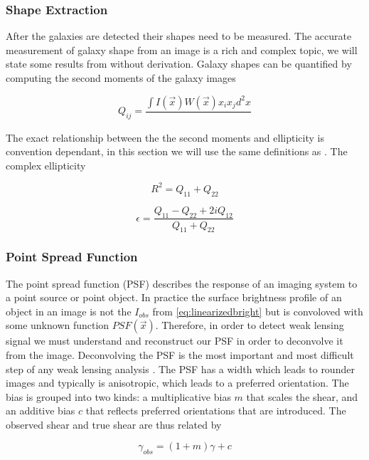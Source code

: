 \subsubsection{Shape Extraction}
After the galaxies are detected their shapes need to be measured. The accurate measurement of galaxy shape from an image is a rich and complex topic, we will state some results from \cite{massey_2013,general_2013} without derivation. Galaxy shapes can be quantified by computing the second moments of the galaxy images 

\begin{equation}
    Q_{ij} = \frac{\int  I(\vec{x}) W(\vec{x})x_ix_j d^2x}{}
    \label{eq:moments}
\end{equation}


The exact relationship between the the second moments and ellipticity is convention dependant, in this section we will use the same definitions as \cite{rachel_2018,Hoekstra:2013gua}. The complex ellipticity 

\begin{equation}
    R^2 = Q_{11} + Q_{22}
    \label{eq:size}
\end{equation}

\begin{equation}
    \epsilon = \frac{Q_{11}-Q_{22}+2iQ_{12}}{Q_{11}+Q_{22}}
    \label{eq:ellipticity}
\end{equation}

 

\subsubsection{Point Spread Function}

The point spread function (PSF) describes the response of an imaging system to a point source or point object. In practice the surface brightness profile of an object in an image is not the $I_{obs}$ from \autoref{eq:linearizedbright} but is convoloved with some unknown function $PSF(\vec{x})$. Therefore, in order to detect weak lensing signal we must understand and reconstruct our PSF in order to deconvolve it from the image. Deconvolving the PSF is the most important and most difficult step of any weak lensing analysis \cite{Hoekstra:2013gua,rachel_2018}. The PSF has a width which leads to rounder images and typically is anisotropic, which leads to a preferred orientation. The bias is grouped into two kinds: a multiplicative bias $m$ that scales the shear, and an additive bias $c$ that reflects preferred orientations that are introduced. The observed shear and true shear are thus related by

\begin{equation}
    \gamma_{obs} = (1+m) \gamma + c
     \label{eq:shearobs}
\end{equation}



